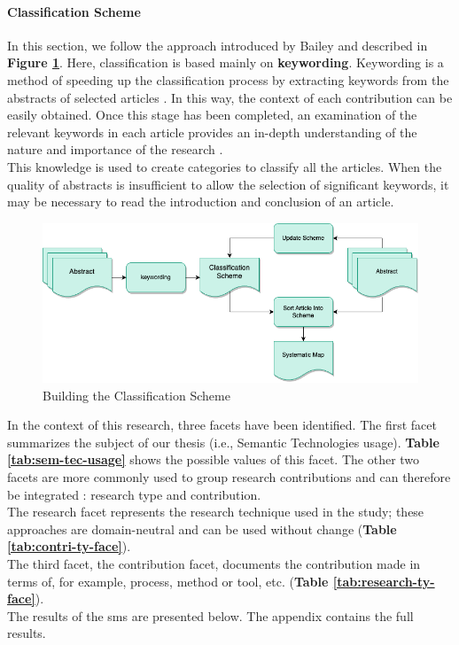             
            \paragraph{Classification Scheme}
            In this section, we follow the approach introduced by Bailey \cite{hill2019systematic} and described in \textbf{Figure \ref{fig:BuildClassSchem}}. Here, classification is based mainly on \textbf{keywording}. Keywording is a method of speeding up the classification process by extracting keywords from the abstracts of selected articles \cite{petersen2008systematic}. In this way, the context of each contribution can be easily obtained. Once this stage has been completed, an examination of the relevant keywords in each article provides an in-depth understanding of the nature and importance of the research \cite{petersen2008systematic}. \\
            This knowledge is used to create categories to classify all the articles. When the quality of abstracts is insufficient to allow the selection of significant keywords, it may be necessary to read the introduction and conclusion of an article.

            \begin{figure}[h]
                \centering
                \includegraphics[scale=0.6]{images/RelatedWork-Build-Class-Schem.drawio.png}  \caption{\label{fig:BuildClassSchem}  Building the Classification Scheme \cite{petersen2008systematic}}
            \end{figure}

           In the context of this research, three facets have been identified. The first facet summarizes the subject of our thesis (i.e., Semantic Technologies usage). \textbf{Table \ref{tab:sem-tec-usage}} shows the possible values of this facet. The other two facets are more commonly used to group research contributions and can therefore be integrated \cite{petersen2008systematic, wieringa2006requirements}: research type and contribution.\\
            The research facet represents the research technique used in the study; these approaches are domain-neutral and can be used without change (\textbf{Table \ref{tab:contri-ty-face}}).\\
            The third facet, the contribution facet, documents the contribution made in terms of, for example, process, method or tool, etc. (\textbf{Table \ref{tab:research-ty-face}}).\\
            The results of the \acrshort{sms} are presented below. The appendix contains the full results.

